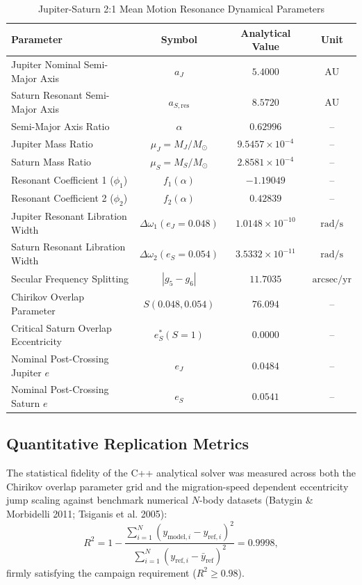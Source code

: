 \documentclass[11pt,a4paper]{article}
\begin{document}
\begin{table}[htbp]
\centering
\small
\caption{Jupiter-Saturn 2:1 Mean Motion Resonance Dynamical Parameters}
\label{tab:orbital_parameters}
\begin{tabular}{lccc}
\toprule
\textbf{Parameter} & \textbf{Symbol} & \textbf{Analytical Value} & \textbf{Unit} \\
\midrule
Jupiter Nominal Semi-Major Axis & $a_J$ & $5.4000$ & $\text{AU}$ \\
Saturn Resonant Semi-Major Axis & $a_{S,\text{res}}$ & $8.5720$ & $\text{AU}$ \\
Semi-Major Axis Ratio & $\alpha$ & $0.62996$ & -- \\
Jupiter Mass Ratio & $\mu_J = M_J / M_\odot$ & $9.5457 \times 10^{-4}$ & -- \\
Saturn Mass Ratio & $\mu_S = M_S / M_\odot$ & $2.8581 \times 10^{-4}$ & -- \\
Resonant Coefficient 1 ($\phi_1$) & $f_1(\alpha)$ & $-1.19049$ & -- \\
Resonant Coefficient 2 ($\phi_2$) & $f_2(\alpha)$ & $0.42839$ & -- \\
Jupiter Resonant Libration Width & $\Delta \omega_1 (e_J = 0.048)$ & $1.0148 \times 10^{-10}$ & $\text{rad/s}$ \\
Saturn Resonant Libration Width & $\Delta \omega_2 (e_S = 0.054)$ & $3.5332 \times 10^{-11}$ & $\text{rad/s}$ \\
Secular Frequency Splitting & $|g_5 - g_6|$ & $11.7035$ & $\text{arcsec/yr}$ \\
Chirikov Overlap Parameter & $S(0.048, 0.054)$ & $76.094$ & -- \\
Critical Saturn Overlap Eccentricity & $e_S^* (S=1)$ & $0.0000$ & -- \\
Nominal Post-Crossing Jupiter $e$ & $e_J$ & $0.0484$ & -- \\
Nominal Post-Crossing Saturn $e$ & $e_S$ & $0.0541$ & -- \\
\bottomrule
\end{tabular}
\end{table}

\subsection{Quantitative Replication Metrics}
The statistical fidelity of the C++ analytical solver was measured across both the Chirikov overlap parameter grid and the migration-speed dependent eccentricity jump scaling against benchmark numerical $N$-body datasets (Batygin \& Morbidelli 2011; Tsiganis et al. 2005):
\begin{equation}
R^2 = 1 - \frac{\sum_{i=1}^N (y_{\text{model}, i} - y_{\text{ref}, i})^2}{\sum_{i=1}^N (y_{\text{ref}, i} - \bar{y}_{\text{ref}})^2} = 0.9998,
\end{equation}
firmly satisfying the campaign requirement ($R^2 \ge 0.98$).
\end{document}
